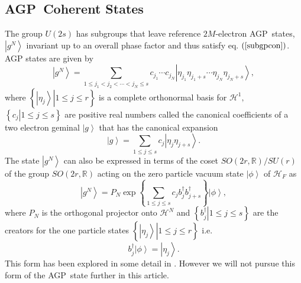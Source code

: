 \documentclass[12pt,aps,amsfonts,amssymb,tightenlines]{revtex4}%
\begin{document}
\subsection{AGP\ Coherent States}

The group $U\left(  2s\right)  $ has subgroups that leave reference
$2M$-electron AGP\ states, $\left\vert g^{N}\right\rangle $ invariant up to an
overall phase factor and thus satisfy eq. $\left(  \ref{subgpcon}\right)  $.
AGP states are given \cite{Weiner&ortiz04} by%
\begin{equation}
\left\vert g^{N}\right\rangle =\sum_{1\leq j_{1}<j_{2}<\cdots<j_{N}\leq
s}c_{j_{1}}\cdots c_{j_{N}}\left\vert \eta_{j_{1}}\eta_{j_{1}+s}\cdots
\eta_{j_{N}}\eta_{j_{N}+s}\right\rangle , \label{canexp}%
\end{equation}
where $\left\{  \left.  \left\vert \eta_{j}\right\rangle \right\vert 1\leq
j\leq r\right\}  $ is a complete orthonormal basis for $\mathcal{H}^{1},$
$\left\{  \left.  c_{j}\right\vert 1\leq j\leq s\right\}  $ are positive real
numbers called the canonical coefficients of a two electron geminal
$\left\vert g\right\rangle $ that has the canonical expansion
\begin{equation}
\left\vert g\right\rangle =\sum_{1\leq j\leq s}c_{j}\left\vert \eta_{j}%
\eta_{j+s}\right\rangle . \label{gemcan}%
\end{equation}
The state $\left\vert g^{N}\right\rangle $ can also be expressed in terms of
the coset $SO\left(  2r,\mathbb{R}\right)  /SU\left(  r\right)  $ of the group
$SO\left(  2r,\mathbb{R}\right)  $ acting on the zero particle vacuum state
$\left\vert \phi\right\rangle $ of $\mathcal{H}_{F}$ \cite{Deumens87} as
\begin{equation}
\left\vert g^{N}\right\rangle =P_{N}\exp\left\{  \sum_{1\leq j\leq s}%
c_{j}b_{j}^{\dagger}b_{j+s}^{\dagger}\right\}  \left\vert \phi\right\rangle ,
\end{equation}
where $P_{N}$ is the orthogonal projector onto $\mathcal{H}^{N}$ and $\left\{
\left.  b_{j}^{\dagger}\right\vert 1\leq j\leq s\right\}  $ are the creators
for the one particle states $\left\{  \left.  \left\vert \eta_{j}\right\rangle
\right\vert 1\leq j\leq r\right\}  $ i.e.
\begin{equation}
b_{j}^{\dagger}\left\vert \phi\right\rangle =\left\vert \eta_{j}\right\rangle
.
\end{equation}
This form has been explored in some detail in \cite{Weiner94}. However we will
not pursue this form of the AGP\ state further in this article.
\end{document}
